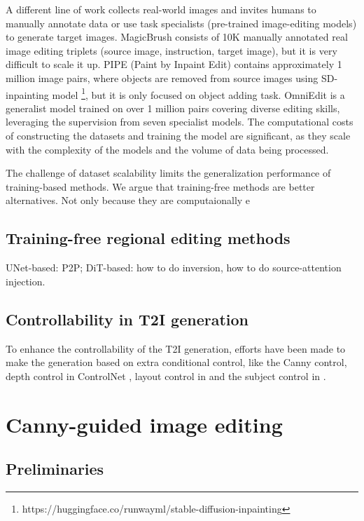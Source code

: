 \documentclass{article}
\begin{document}
A different line of work collects real-world images and invites humans to manually annotate data or use task specialists (pre-trained image-editing models) to generate target images. MagicBrush \citep{zhang2023magicbrush} consists of 10K manually annotated real image editing triplets (source image,
instruction, target image), but it is very difficult to scale it up.  PIPE (Paint by Inpaint Edit) \citep{wasserman2024paint} contains approximately 1 million image pairs, where objects are removed from source images using SD-inpainting model \footnote{https://huggingface.co/runwayml/stable-diffusion-inpainting}, but it is only focused on object adding task. OmniEdit \citep{wei2024omniedit} is a generalist model trained on over 1 million pairs covering diverse editing skills, leveraging the supervision from seven specialist models. The computational costs of constructing the datasets and training the model are significant, as they scale with the complexity of the models and the volume of data being processed. 

The challenge of dataset scalability limits the generalization performance of training-based methods. We argue that training-free methods are better alternatives. Not only because they are computaionally e


\subsection{Training-free regional editing methods}

UNet-based: P2P;
DiT-based: how to do inversion, how to do source-attention injection.

\subsection{Controllability in T2I generation}

 To enhance the controllability of the T2I generation, efforts have been made to make the generation based on extra conditional control, like the Canny control, depth control in ControlNet \citep{zhang2023adding}, layout control in \citet{feng2024ranni,yang2024mastering} and the subject control in \citet{ye2023ip,wang2024instantid}. 

\section{Canny-guided image editing}
\subsection{Preliminaries}
\end{document}
